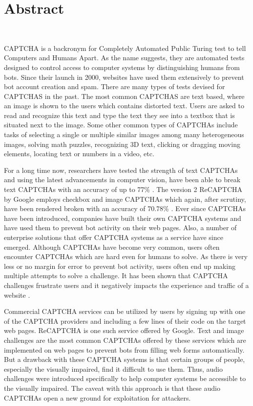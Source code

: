 \section{Abstract}\mbox{}\
\label{sec:abstract}

CAPTCHA is a backronym for Completely Automated Public Turing test to tell Computers and Humans Apart. As the name suggests, they are automated tests designed to control access to computer systems by distinguishing humans from bots. Since their launch in 2000, websites have used them extensively to prevent bot account creation and spam. There are many types of tests devised for CAPTCHAS in the past. The most common CAPTCHAS are text based, where an image is shown to the users which contains distorted text. Users are asked to read and recognize this text and type the text they see into a textbox that is situated next to the image. Some other common types of CAPTCHAs include tasks of selecting a single or multiple similar images among many heterogeneous images, solving math puzzles, recognizing 3D text, clicking or dragging moving elements, locating text or numbers in a video, etc. \newline

For a long time now, researchers have tested the strength of text CAPTCHAs and using the latest advancements in computer vision, have been able to break text CAPTCHAs with an accuracy of up to 77\% \cite{ebay:machine-noise}. The version 2 ReCAPTCHA by Google employs checkbox and image CAPTCHAs which again, after scrutiny, have been rendered broken with an accuracy of 70.78\% \cite{recurrent:machine-noise}. Ever since CAPTCHAs have been introduced, companies have built their own CAPTCHA systems and have used them to prevent bot activity on their web pages. Also, a number of enterprise solutions that offer CAPTCHA systems as a service have since emerged. Although CAPTCHAs have become very common, users often encounter CAPTCHAs which are hard even for humans to solve. As there is very less or no margin for error to prevent bot activity, users often end up making multiple attempts to solve a challenge. It has been shown that CAPTCHA challenges frustrate users and it negatively impacts the experience and traffic of a website \cite{distil}.\newline

Commercial CAPTCHA services can be utilized by users by signing up with one of the CAPTCHA providers and including a few lines of their code on the target web pages. ReCAPTCHA is one such service offered by Google. Text and image challenges are the most common CAPTCHAs offered by these services which are implemented on web pages to prevent bots from filling web forms automatically. But a drawback with these CAPTCHA systems is that certain groups of people, especially the visually impaired, find it difficult to use them. Thus, audio challenges were introduced specifically to help computer systems be accessible to the visually impaired. The caveat with this approach is that these audio CAPTCHAs open a new ground for exploitation for attackers.\newline

